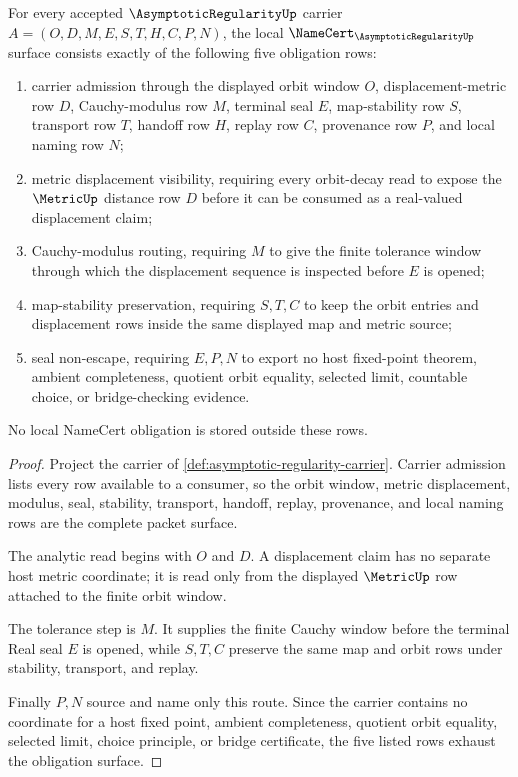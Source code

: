 \begin{theorem}
\label{thm:asymptotic-regularity-namecert-obligations}
For every accepted $\AsymptoticRegularityUp$ carrier $A=(O,D,M,E,S,T,H,C,P,N)$, the local $\NameCert_{\AsymptoticRegularityUp}$ surface consists exactly of the following five obligation rows:
\begin{enumerate}
\item carrier admission through the displayed orbit window $O$, displacement-metric row $D$, Cauchy-modulus row $M$, terminal seal $E$, map-stability row $S$, transport row $T$, handoff row $H$, replay row $C$, provenance row $P$, and local naming row $N$;
\item metric displacement visibility, requiring every orbit-decay read to expose the $\MetricUp$ distance row $D$ before it can be consumed as a real-valued displacement claim;
\item Cauchy-modulus routing, requiring $M$ to give the finite tolerance window through which the displacement sequence is inspected before $E$ is opened;
\item map-stability preservation, requiring $S,T,C$ to keep the orbit entries and displacement rows inside the same displayed map and metric source;
\item seal non-escape, requiring $E,P,N$ to export no host fixed-point theorem, ambient completeness, quotient orbit equality, selected limit, countable choice, or bridge-checking evidence.
\end{enumerate}
No local NameCert obligation is stored outside these rows.
\end{theorem}
\begin{proof}
Project the carrier of \autoref{def:asymptotic-regularity-carrier}. Carrier admission lists every row available to a consumer, so the orbit window, metric displacement, modulus, seal, stability, transport, handoff, replay, provenance, and local naming rows are the complete packet surface.

The analytic read begins with $O$ and $D$. A displacement claim has no separate host metric coordinate; it is read only from the displayed $\MetricUp$ row attached to the finite orbit window.

The tolerance step is $M$. It supplies the finite Cauchy window before the terminal Real seal $E$ is opened, while $S,T,C$ preserve the same map and orbit rows under stability, transport, and replay.

Finally $P,N$ source and name only this route. Since the carrier contains no coordinate for a host fixed point, ambient completeness, quotient orbit equality, selected limit, choice principle, or bridge certificate, the five listed rows exhaust the obligation surface.
\end{proof}

